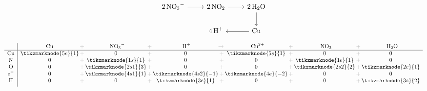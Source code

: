 \documentclass{ctexart}
\newcommand{\grayplus}{\,\color{lightgray}+\,}
\newcommand{\grayto}{\,\color{lightgray}\to\,}
\newcommand{\arrowLR}[3]{%
    \draw[->|,red,thick]
    ([xshift=2pt]#1.south east)
    .. controls ++(0.3cm,-0.2cm) and ++(-0.3cm,-0.2cm) ..
    ([xshift=-2pt]#2.south west)
    node[midway,below,blue,font=\small] {#3};
}
\newcommand{\arrowRL}[3]{%
    \draw[->|,red,thick]
    ([xshift=-2pt]#1.south west)
    .. controls ++(-0.3cm,-0.2cm) and ++(0.3cm,-0.2cm) ..
    ([xshift=2pt]#2.south east)
    node[midway,below,blue,font=\small] {#3};
}
\newcommand{\arrowsToOneLR}[4]{%
    \draw[->,red,thick]
    ([xshift=2pt]#1.south east)
    .. controls ++(0.3cm,-0.2cm) and ++(-0.3cm,-0.2cm) ..
    ([xshift=-2pt]#3.south west)
    node[midway,below,blue,font=\small] {#4};
    \draw[->,red,thick]
    (#2.south)
    .. controls ++(0.3cm,-0.2cm) and ++(-0.3cm,-0.2cm) ..
    ([xshift=-2pt]#3.south west);
}
\begin{document}
{\begin{center}
\begin{minipage}[c]{0.42\textwidth}
            \[
                \begin{tikzcd}
                    \ce{2NO3^-} \arrow[r] & \ce{2NO2} \arrow[r] &
                    \ce{2H2O} \arrow[d] \\
                    & \ce{4H^+} & \ce{Cu} \arrow[l]
                \end{tikzcd}
            \]
        \end{minipage}%
        \hspace{0.01\textwidth}
        \begin{minipage}[c]{0.5\textwidth}
            \[
                \begin{array}{c|*{5}{c@{\grayplus}}c}
                    & \multicolumn{1}{c@{\grayplus}}{\ce{Cu}} &
                    \multicolumn{1}{c@{\grayplus}}{\ce{NO3^-}} &
                    \multicolumn{1}{c@{\grayto}}{\ce{H^+}} &
                    \multicolumn{1}{c@{\grayplus}}{\ce{Cu^{2+}}} &
                    \multicolumn{1}{c@{\grayplus}}{\ce{NO2}} &
                    \multicolumn{1}{c}{\ce{H2O}} \\
                    \hline
                    \ce{Cu} & \tikzmarknode{5e}{1} & 0 & 0 &
                    \tikzmarknode{5s}{1} & 0 & 0\\
                    \ce{N} & 0 & \tikzmarknode{1s}{1} & 0 & 0
                    &\tikzmarknode{1e}{1} & 0\\
                    \ce{O} & 0 & \tikzmarknode{2s1}{3} & 0 & 0 &
                    \tikzmarknode{2s2}{2} & \tikzmarknode{2e}{1}\\
                    \ce{e-} & 0 & \tikzmarknode{4s1}{1} &
                    \tikzmarknode{4s2}{-1} & \tikzmarknode{4e}{-2} & 0 & 0\\
                    \ce{H} & 0 & 0 & \tikzmarknode{3e}{1} & 0 & 0 &
                    \tikzmarknode{3s}{2}\\[1ex]
                \end{array}
            \]
        \end{minipage}
    \end{center}
}
\end{document}
